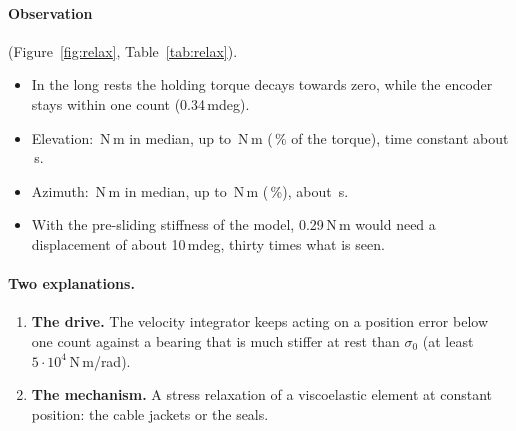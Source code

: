 \documentclass[10pt,a4paper]{article}
\numberwithin{equation}{section}
\begin{document}
\paragraph{Observation} (Figure~\ref{fig:relax}, Table~\ref{tab:relax}).
\begin{itemize}
\item In the long rests the holding torque decays towards zero, while the encoder stays within one count (0.34\,mdeg).
\item Elevation: \relaxMedEl\,N\,m in median, up to \relaxMaxEl\,N\,m (\relaxRelEl\,\% of the torque), time constant about \tauEl\,s.
\item Azimuth: \relaxMedAz\,N\,m in median, up to \relaxMaxAz\,N\,m (\relaxRelAz\,\%), about \tauAz\,s.
\item With the pre-sliding stiffness of the model, 0.29\,N\,m would need a displacement of about 10\,mdeg, thirty times what is seen.
\end{itemize}
\paragraph{Two explanations.}
\begin{enumerate}
\item \textbf{The drive.} The velocity integrator keeps acting on a position error below one count against a bearing that is much stiffer at rest than $\sigma_0$ (at least $5\cdot10^4$\,N\,m/rad).
\item \textbf{The mechanism.} A stress relaxation of a viscoelastic element at constant position: the cable jackets or the seals.
\end{enumerate}
\end{document}
